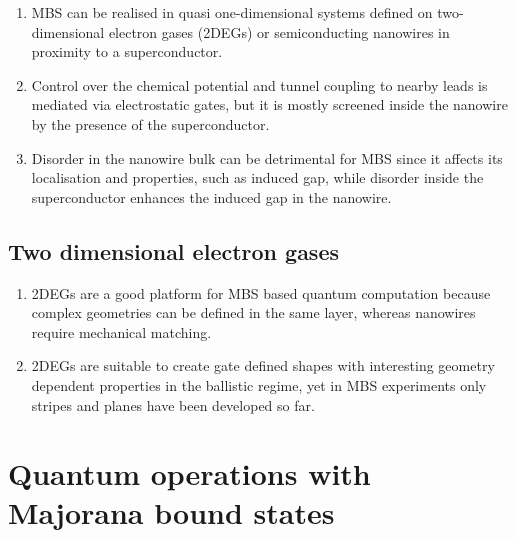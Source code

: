 \begin{enumerate}
\item MBS can be realised in quasi one-dimensional systems defined on two-dimensional electron gases (2DEGs) or semiconducting nanowires in proximity to a superconductor.
 \item Control over the chemical potential and tunnel coupling to nearby leads is mediated via electrostatic gates, but it is mostly screened inside the nanowire by the presence of the superconductor.
\item Disorder in the nanowire bulk can be detrimental for MBS since it affects its localisation and properties, such as induced gap, while disorder inside the superconductor enhances the induced gap in the nanowire.
\end{enumerate}

\subsection{Two dimensional electron gases}

\begin{enumerate}
\item 2DEGs are a good platform for MBS based quantum computation because complex geometries can be defined in the same layer, whereas nanowires require mechanical matching.
\item 2DEGs are suitable to create gate defined shapes with interesting geometry dependent properties in the ballistic regime, yet in MBS experiments only stripes and planes have been developed so far.
\end{enumerate}


\section{Quantum operations with Majorana bound states}

